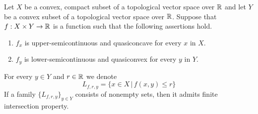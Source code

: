 \begin{lemma}\label{lemma:finiteintersectionsionslemma}
Let $X$ be a convex, compact subset of a topological vector space over ${\mathbb R}$ and let $Y$ be a convex subset of a topological vector space over ${\mathbb R}$. Suppose that $f:X\times Y\rightarrow {\mathbb R}$ is a function such that the following assertions hold.
\begin{enumerate}[label=\emph{\textbf{(\arabic*)}}, leftmargin=1.5em]
\item $f_x$ is upper-semicontinuous and quasiconcave for every $x$ in $X$.
\item $f_y$ is lower-semicontinuous and quasiconvex for every $y$ in $Y$.
\end{enumerate}
For every $y\in Y$ and $r \in {\mathbb R}$ we denote
$$L_{f,r,y} = \big\{x\in X\,\big|\,f(x,y)\leq r \big\}$$
If a family $\{L_{f,r,y}\}_{y\in Y}$ consists of nonempty sets, then it admits finite intersection property.
\end{lemma}
